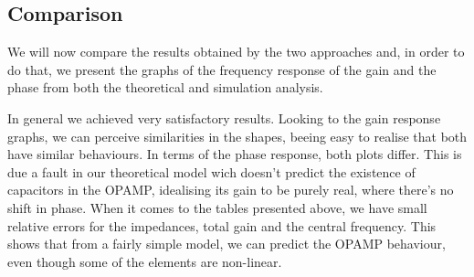 \subsection{Comparison}
\label{subsec:comparison}

We will now compare the results obtained by the two approaches and, in order to do that, we present the graphs of the frequency response of the gain and the phase from both the theoretical and simulation analysis.

In general we achieved very satisfactory results. Looking to the gain response graphs, we can perceive similarities in the shapes, beeing easy to realise that both have similar behaviours. In terms of the phase response, both plots differ. This is due a fault in our theoretical model wich doesn't predict the existence of capacitors in the OPAMP, idealising its gain to be purely real, where there's no shift in phase. When it comes to the tables presented above, we have small relative errors for the impedances, total gain and the central frequency. This shows that from a fairly simple model, we can predict the OPAMP behaviour, even though some of the elements are non-linear.



